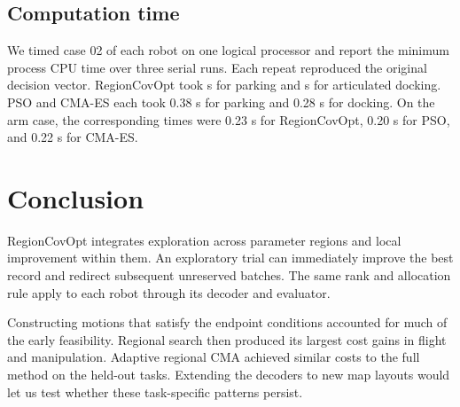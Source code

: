 \subsection{Computation time}

We timed case 02 of each robot on one logical processor and report the minimum process CPU time over three serial runs. Each repeat reproduced the original decision vector. RegionCovOpt took \CarCPU{} s for parking and \DockCPU{} s for articulated docking. PSO and CMA-ES each took 0.38 s for parking and 0.28 s for docking. On the arm case, the corresponding times were 0.23 s for RegionCovOpt, 0.20 s for PSO, and 0.22 s for CMA-ES.




\section{Conclusion}
RegionCovOpt integrates exploration across parameter regions and local improvement within them. An exploratory trial can immediately improve the best record and redirect subsequent unreserved batches. The same rank and allocation rule apply to each robot through its decoder and evaluator.

Constructing motions that satisfy the endpoint conditions accounted for much of the early feasibility. Regional search then produced its largest cost gains in flight and manipulation. Adaptive regional CMA achieved similar costs to the full method on the held-out tasks. Extending the decoders to new map layouts would let us test whether these task-specific patterns persist.
